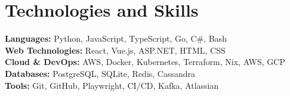 \documentclass[10pt,a4paper]{article}
\begin{document}
	\section{Technologies and Skills}
	\textbf{Languages:} Python, JavaScript, TypeScript, Go, C\#, Bash \\
	\hspace*{0.5cm}\textbf{Web Technologies:} React, Vue.js, ASP.NET, HTML, CSS \\
	\hspace*{0.5cm}\textbf{Cloud \& DevOps:} AWS, Docker, Kubernetes, Terraform, Nix, AWS, GCP \\
	\hspace*{0.5cm}\textbf{Databases:} PostgreSQL, SQLite, Redis, Cassandra \\
	\hspace*{0.5cm}\textbf{Tools:} Git, GitHub, Playwright, CI/CD, Kafka, Atlassian
	
\end{document}
